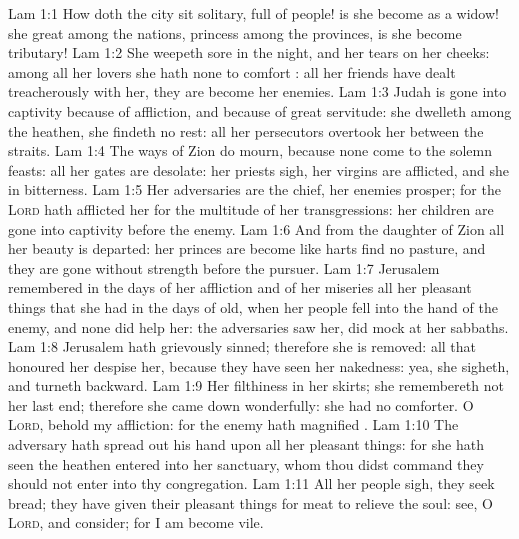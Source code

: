 \vs Lam 1:1 How doth the city sit solitary,  full of people!  is she become as a widow! she  great among the nations,  princess among the provinces,  is she become tributary!
\vs Lam 1:2 She weepeth sore in the night, and her tears  on her cheeks: among all her lovers she hath none to comfort : all her friends have dealt treacherously with her, they are become her enemies.
\vs Lam 1:3 Judah is gone into captivity because of affliction, and because of great servitude: she dwelleth among the heathen, she findeth no rest: all her persecutors overtook her between the straits.
\vs Lam 1:4 The ways of Zion do mourn, because none come to the solemn feasts: all her gates are desolate: her priests sigh, her virgins are afflicted, and she  in bitterness.
\vs Lam 1:5 Her adversaries are the chief, her enemies prosper; for the \textsc{Lord} hath afflicted her for the multitude of her transgressions: her children are gone into captivity before the enemy.
\vs Lam 1:6 And from the daughter of Zion all her beauty is departed: her princes are become like harts  find no pasture, and they are gone without strength before the pursuer.
\vs Lam 1:7 Jerusalem remembered in the days of her affliction and of her miseries all her pleasant things that she had in the days of old, when her people fell into the hand of the enemy, and none did help her: the adversaries saw her,  did mock at her sabbaths.
\vs Lam 1:8 Jerusalem hath grievously sinned; therefore she is removed: all that honoured her despise her, because they have seen her nakedness: yea, she sigheth, and turneth backward.
\vs Lam 1:9 Her filthiness  in her skirts; she remembereth not her last end; therefore she came down wonderfully: she had no comforter. O \textsc{Lord}, behold my affliction: for the enemy hath magnified .
\vs Lam 1:10 The adversary hath spread out his hand upon all her pleasant things: for she hath seen  the heathen entered into her sanctuary, whom thou didst command  they should not enter into thy congregation.
\vs Lam 1:11 All her people sigh, they seek bread; they have given their pleasant things for meat to relieve the soul: see, O \textsc{Lord}, and consider; for I am become vile.
